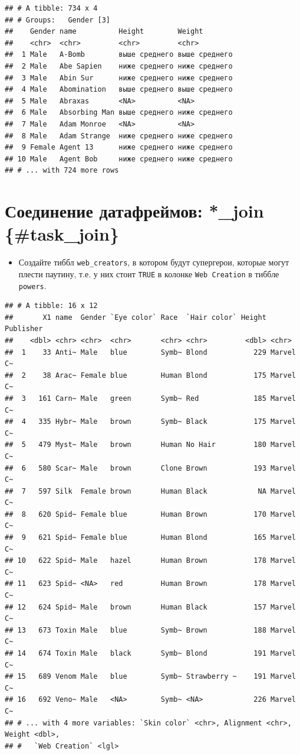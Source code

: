 \documentclass[]{book}
\providecommand{\tightlist}{%
  \setlength{\itemsep}{0pt}\setlength{\parskip}{0pt}}
\begin{document}
\begin{verbatim}
## # A tibble: 734 x 4
## # Groups:   Gender [3]
##    Gender name          Height        Weight       
##    <chr>  <chr>         <chr>         <chr>        
##  1 Male   A-Bomb        выше среднего выше среднего
##  2 Male   Abe Sapien    ниже среднего ниже среднего
##  3 Male   Abin Sur      ниже среднего ниже среднего
##  4 Male   Abomination   выше среднего выше среднего
##  5 Male   Abraxas       <NA>          <NA>         
##  6 Male   Absorbing Man выше среднего ниже среднего
##  7 Male   Adam Monroe   <NA>          <NA>         
##  8 Male   Adam Strange  ниже среднего ниже среднего
##  9 Female Agent 13      ниже среднего ниже среднего
## 10 Male   Agent Bob     ниже среднего ниже среднего
## # ... with 724 more rows
\end{verbatim}

\section{Соединение датафреймов: *\_join
\{\#task\_join\}}\label{ux441ux43eux435ux434ux438ux43dux435ux43dux438ux435-ux434ux430ux442ux430ux444ux440ux435ux439ux43cux43eux432-_join-task_join}

\begin{itemize}
\tightlist
\item
  Создайте тиббл \texttt{web\_creators}, в котором будут супергерои,
  которые могут плести паутину, т.е. у них стоит \texttt{TRUE} в колонке
  \texttt{Web\ Creation} в тиббле \texttt{powers}.
\end{itemize}

\begin{verbatim}
## # A tibble: 16 x 12
##       X1 name  Gender `Eye color` Race  `Hair color` Height Publisher
##    <dbl> <chr> <chr>  <chr>       <chr> <chr>         <dbl> <chr>    
##  1    33 Anti~ Male   blue        Symb~ Blond           229 Marvel C~
##  2    38 Arac~ Female blue        Human Blond           175 Marvel C~
##  3   161 Carn~ Male   green       Symb~ Red             185 Marvel C~
##  4   335 Hybr~ Male   brown       Symb~ Black           175 Marvel C~
##  5   479 Myst~ Male   brown       Human No Hair         180 Marvel C~
##  6   580 Scar~ Male   brown       Clone Brown           193 Marvel C~
##  7   597 Silk  Female brown       Human Black            NA Marvel C~
##  8   620 Spid~ Female blue        Human Brown           170 Marvel C~
##  9   621 Spid~ Female blue        Human Blond           165 Marvel C~
## 10   622 Spid~ Male   hazel       Human Brown           178 Marvel C~
## 11   623 Spid~ <NA>   red         Human Brown           178 Marvel C~
## 12   624 Spid~ Male   brown       Human Black           157 Marvel C~
## 13   673 Toxin Male   blue        Symb~ Brown           188 Marvel C~
## 14   674 Toxin Male   black       Symb~ Blond           191 Marvel C~
## 15   689 Venom Male   blue        Symb~ Strawberry ~    191 Marvel C~
## 16   692 Veno~ Male   <NA>        Symb~ <NA>            226 Marvel C~
## # ... with 4 more variables: `Skin color` <chr>, Alignment <chr>, Weight <dbl>,
## #   `Web Creation` <lgl>
\end{verbatim}
\end{document}

